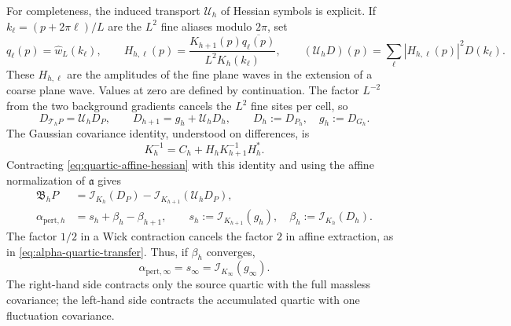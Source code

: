 \documentclass[11pt]{article}
\numberwithin{equation}{section}
\theoremstyle{definition}
\theoremstyle{plain}
\begin{document}
For completeness, the induced transport $\mathcal U_h$ of Hessian
symbols is explicit.  If $k_\ell=(p+2\pi\ell)/L$ are the $L^2$
fine aliases modulo $2\pi$, set
\begin{equation}
 q_\ell(p)=\widehat w_L(k_\ell),\qquad
 H_{h,\ell}(p)
   =\frac{K_{h+1}(p)\overline{q_\ell(p)}}{L^2K_h(k_\ell)},
 \qquad
 (\mathcal U_hD)(p)=\sum_\ell|H_{h,\ell}(p)|^2D(k_\ell).
 \label{eq:quartic-hessian-transport}
\end{equation}
These $H_{h,\ell}$ are the amplitudes of the fine plane waves
in the extension of a coarse plane wave.  Values at zero are
defined by continuation.  The factor $L^{-2}$ from the two
background gradients cancels the $L^2$ fine sites per cell, so
\begin{equation}
 D_{\mathcal T_hP}=\mathcal U_hD_P,\qquad
 D_{h+1}=g_h+\mathcal U_hD_h,\qquad
 D_h:=D_{P_h},\quad g_h:=D_{G_h}.
 \label{eq:quartic-hessian-recursion}
\end{equation}
The Gaussian covariance identity, understood on differences, is
\begin{equation}
 K_h^{-1}=C_h+H_hK_{h+1}^{-1}H_h^*.
 \label{eq:quartic-covariance-telescope}
\end{equation}
Contracting \eqref{eq:quartic-affine-hessian} with this identity
and using the affine normalization of $\mathfrak a$ gives
\begin{align}
 \mathfrak B_hP
   &=\mathcal I_{K_h}(D_P)
       -\mathcal I_{K_{h+1}}(\mathcal U_hD_P),\\
 \alpha_{\mathrm{pert},h}
   &=s_h+\beta_h-\beta_{h+1},\qquad
 s_h:=\mathcal I_{K_{h+1}}(g_h),\quad
 \beta_h:=\mathcal I_{K_h}(D_h).
 \label{eq:quartic-alpha-telescope}
\end{align}
The factor $1/2$ in a Wick contraction cancels the factor $2$
in affine extraction, as in
\eqref{eq:alpha-quartic-transfer}.  Thus, if $\beta_h$ converges,
\begin{equation}
 \alpha_{\mathrm{pert},\infty}
      =s_\infty=\mathcal I_{K_\infty}(g_\infty).
 \label{eq:quartic-limit-source-contraction}
\end{equation}
The right-hand side contracts only the source quartic with the
full massless covariance; the left-hand side contracts the
accumulated quartic with one fluctuation covariance.
\end{document}

